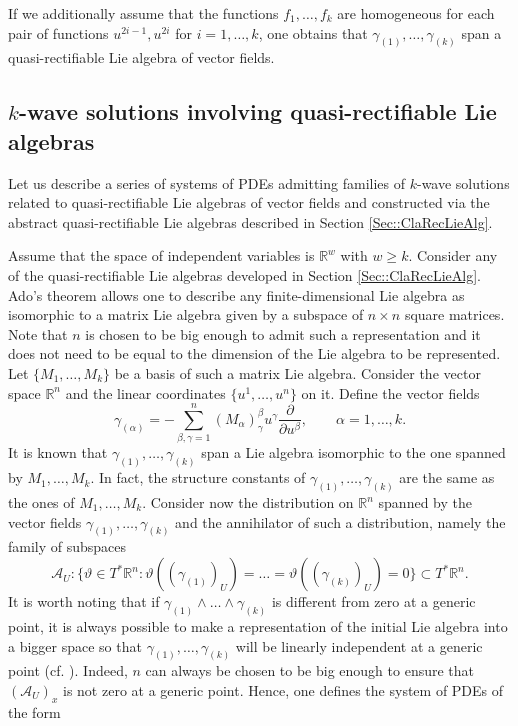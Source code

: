 \documentclass[12pt]{article}
\theoremstyle{plain}
\theoremstyle{definition}
\numberwithin{equation}{section}
\begin{document}
If we additionally assume that the functions $f_1,\ldots,f_k$ are homogeneous for  each pair of functions $u^{2i-1},u^{2i}$ for $i=1,\ldots,k$, one obtains that $\gamma_{(1)},\ldots,\gamma_{(k)}$ span a quasi-rectifiable Lie algebra of vector fields.


\subsection{$k$-wave solutions  involving quasi-rectifiable Lie algebras}
Let us describe a series of systems of PDEs admitting families of $k$-wave solutions related to quasi-rectifiable Lie algebras of vector fields and constructed via the abstract quasi-rectifiable Lie algebras described in Section \ref{Sec::ClaRecLieAlg}. 


Assume that the space of independent variables is $\mathbb{R}^w$ with $w
\geq k$. Consider any of the quasi-rectifiable Lie algebras developed in Section \ref{Sec::ClaRecLieAlg}. Ado's theorem allows one to describe any finite-dimensional Lie algebra as isomorphic to a matrix Lie algebra given by a subspace of $n\times n$ square matrices. Note that $n$ is chosen to be big enough to admit such a representation and it does not need to be equal to the dimension of the Lie algebra to be represented. Let $\{M_1,\ldots,M_k\}$ be a basis of such a matrix Lie algebra. Consider the vector space $\mathbb{R}^{n}$ and the linear coordinates $\{u^1,\ldots,u^n\}$ on it. Define the vector fields
$$
\gamma_{(\alpha)}=-\sum_{\beta,\gamma=1}^n(M_\alpha)^\beta_\gamma u^\gamma \frac{\partial}{\partial u^\beta},\qquad \alpha=1,\ldots,k.
$$
It is known that $\gamma_{(1)},\ldots,\gamma_{(k)}$ span a Lie algebra isomorphic to the one spanned by  $M_1,\ldots,M_k$. In fact, the structure constants of $\gamma_{(1)},\ldots,\gamma_{(k)}$ are the  same as the ones of $M_1,\ldots,M_k$. Consider now the distribution on $\mathbb{R}^n$ spanned by the vector fields $\gamma_{(1)},\ldots,\gamma_{(k)}$ and the annihilator of such a distribution, namely the family of subspaces
$$
\mathcal{A}_U:\{\vartheta\in T^*\mathbb{R}^{n}:\vartheta((\gamma_{(1)})_U)=\ldots=\vartheta((\gamma_{(k)})_U)=0\}\subset T^*\mathbb{R}^n.
$$
It is worth noting that if $\gamma_{(1)}\wedge\ldots\wedge\gamma_{(k)}$ is different from zero at a generic point, it is always possible to make a representation of the initial Lie algebra into a bigger space so that $\gamma_{(1)},\ldots,\gamma_{(k)}$ will be linearly independent at a generic point (cf. \cite{CL11}). Indeed, $n$ can always be chosen to be big enough to ensure that $(\mathcal{A}_U)_x$ is not zero at a generic point. Hence, one defines  the system of PDEs of the form 
\end{document}
